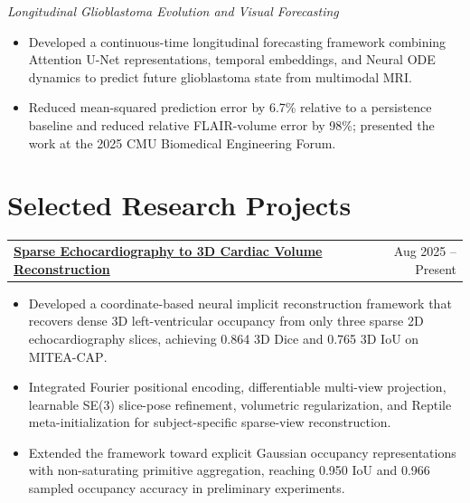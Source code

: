 \documentclass[letterpaper,10pt]{article}
\newcommand{\cvItem}[1]{
    \item \small{#1}
}
\newcommand{\cvProjectHeading}[2]{
    \vspace{1pt}
    \begin{tabularx}{\textwidth}{X r}
        \textbf{#1} & \small #2 \\
    \end{tabularx}
    \vspace{-3pt}
}
\newcommand{\cvItemListStart}{
    \begin{itemize}[
        leftmargin=0.16in,
        itemsep=0.75pt,
        parsep=0pt,
        topsep=1.5pt,
        partopsep=0pt
    ]
}
\newcommand{\cvItemListEnd}{
    \end{itemize}
    \vspace{0pt}
}
\begin{document}
\textit{\small
Longitudinal Glioblastoma Evolution and Visual Forecasting
}

\cvItemListStart

    \cvItem{
    Developed a continuous-time longitudinal forecasting framework combining
    Attention U-Net representations, temporal embeddings, and Neural ODE
    dynamics to predict future glioblastoma state from multimodal MRI.
    }

    \cvItem{
    Reduced mean-squared prediction error by 6.7\% relative to a persistence
    baseline and reduced relative FLAIR-volume error by 98\%; presented the
    work at the 2025 CMU Biomedical Engineering Forum.
    }

\cvItemListEnd



\section{Selected Research Projects}



\cvProjectHeading
    {\href{https://github.com/tushar-nayak/cardiac-reconstruction-evolved}
    {Sparse Echocardiography to 3D Cardiac Volume Reconstruction}}
    {Aug 2025 -- Present}

\cvItemListStart

    \cvItem{
    Developed a coordinate-based neural implicit reconstruction framework that
    recovers dense 3D left-ventricular occupancy from only three sparse 2D
    echocardiography slices, achieving 0.864 3D Dice and 0.765 3D IoU on
    \textsc{MITEA-CAP}.
    }

    \cvItem{
    Integrated Fourier positional encoding, differentiable multi-view
    projection, learnable \textsc{SE(3)} slice-pose refinement, volumetric
    regularization, and Reptile meta-initialization for subject-specific
    sparse-view reconstruction.
    }

    \cvItem{
    Extended the framework toward explicit Gaussian occupancy representations
    with non-saturating primitive aggregation, reaching 0.950 IoU and
    0.966 sampled occupancy accuracy in preliminary experiments.
    }

\cvItemListEnd


\end{document}
